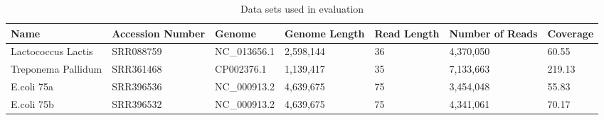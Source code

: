 \documentclass{llncs}
\newcommand{\TBstrut}{{\rule{0pt}{2ex}}{\rule[2ex]{0pt}{0pt}}} %
\begin{document}
\begin{longtable}{|m{22.5mm}|m{17.5mm}|m{19.5mm}|m{14.5mm}|m{10.5mm}|m{14.5mm}|m{14mm}|}
	    \caption{\label{tab:eval-data}Data sets used in evaluation} \\
        \hline
        Name & Accession Number & Genome & Genome Length & Read Length & Number of Reads & Coverage\TBstrut\\ %
        \hline
        Lactococcus Lactis & SRR088759 & NC\_013656.1 & 2,598,144 & 36 & 4,370,050 & 60.55\TBstrut\\ %
        \hline
        Treponema Pallidum & SRR361468 & CP002376.1 & 1,139,417 & 35 & 7,133,663 & 219.13\TBstrut\\ %
        \hline
        E.coli 75a & SRR396536 & NC\_000913.2 & 4,639,675 & 75 & 3,454,048 & 55.83\TBstrut\\ %
        \hline
        E.coli 75b & SRR396532 & NC\_000913.2 & 4,639,675 & 75 & 4,341,061 & 70.17\TBstrut\\ %
        \hline
\end{longtable}
\end{document}
